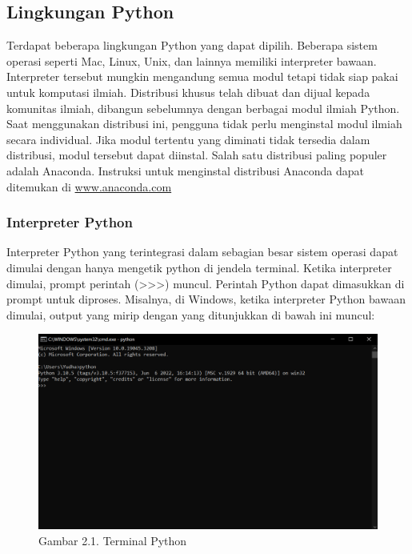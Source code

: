 \documentclass[
  letterpaper,
  DIV=11,
  numbers=noendperiod]{scrreprt}
\begin{document}
\hypertarget{lingkungan-python}{%
\subsection*{Lingkungan Python}\label{lingkungan-python}}

Terdapat beberapa lingkungan Python yang dapat dipilih. Beberapa sistem
operasi seperti Mac, Linux, Unix, dan lainnya memiliki interpreter
bawaan. Interpreter tersebut mungkin mengandung semua modul tetapi tidak
siap pakai untuk komputasi ilmiah. Distribusi khusus telah dibuat dan
dijual kepada komunitas ilmiah, dibangun sebelumnya dengan berbagai
modul ilmiah Python. Saat menggunakan distribusi ini, pengguna tidak
perlu menginstal modul ilmiah secara individual. Jika modul tertentu
yang diminati tidak tersedia dalam distribusi, modul tersebut dapat
diinstal. Salah satu distribusi paling populer adalah Anaconda.
Instruksi untuk menginstal distribusi Anaconda dapat ditemukan di
\href{https://www.anaconda.com/distribution/}{www.anaconda.com}

\hypertarget{interpreter-python}{%
\subsubsection*{Interpreter Python}\label{interpreter-python}}

Interpreter Python yang terintegrasi dalam sebagian besar sistem operasi
dapat dimulai dengan hanya mengetik python di jendela terminal. Ketika
interpreter dimulai, prompt perintah
(\textgreater\textgreater\textgreater) muncul. Perintah Python dapat
dimasukkan di prompt untuk diproses. Misalnya, di Windows, ketika
interpreter Python bawaan dimulai, output yang mirip dengan yang
ditunjukkan di bawah ini muncul:

\begin{figure}

{\centering \includegraphics{Asset/image6.png}

}

\caption{Gambar 2.1. Terminal Python}

\end{figure}
\end{document}
